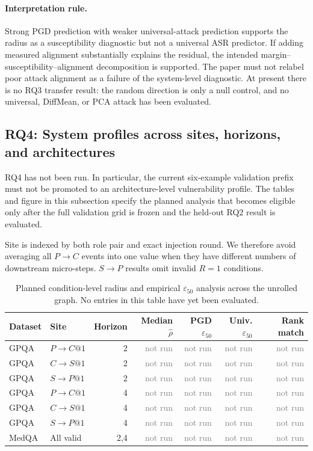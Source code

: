 \documentclass[11pt]{article}
\newcommand{\eps}{\varepsilon}
\newcommand{\NotRun}{\textcolor{gray}{not run}}
\begin{document}
\paragraph{Interpretation rule.}
Strong PGD prediction with weaker universal-attack prediction supports the
radius as a susceptibility diagnostic but not a universal ASR predictor. If
adding measured alignment substantially explains the residual, the intended
margin--susceptibility--alignment decomposition is supported. The paper must
not relabel poor attack alignment as a failure of the system-level diagnostic.
At present there is no RQ3 transfer result: the random direction is only a null
control, and no universal, DiffMean, or PCA attack has been evaluated.

\subsection{RQ4: System profiles across sites, horizons, and architectures}

RQ4 has not been run. In particular, the current six-example validation prefix
must not be promoted to an architecture-level vulnerability profile. The
tables and figure in this subsection specify the planned analysis that becomes
eligible only after the full validation grid is frozen and the held-out RQ2
result is evaluated.

Site is indexed by both role pair and exact injection round. We therefore avoid
averaging all $P{\to}C$ events into one value when they have different numbers
of downstream micro-steps. $S{\to}P$ results omit invalid $R=1$ conditions.

\begin{table}[t]
\centering
\small
\setlength{\tabcolsep}{3.5pt}
\caption{Planned condition-level radius and empirical $\eps_{50}$ analysis
across the unrolled graph. No entries in this table have yet been evaluated.}
\label{tab:site-horizon}
\begin{tabular}{llrrrrr}
\toprule
Dataset & Site & Horizon & Median $\widehat\rho$ & PGD $\eps_{50}$ & Univ. $\eps_{50}$ & Rank match \\
\midrule
GPQA & $P{\to}C@1$ & 2 & \NotRun & \NotRun & \NotRun & \NotRun \\
GPQA & $C{\to}S@1$ & 2 & \NotRun & \NotRun & \NotRun & \NotRun \\
GPQA & $S{\to}P@1$ & 2 & \NotRun & \NotRun & \NotRun & \NotRun \\
GPQA & $P{\to}C@1$ & 4 & \NotRun & \NotRun & \NotRun & \NotRun \\
GPQA & $C{\to}S@1$ & 4 & \NotRun & \NotRun & \NotRun & \NotRun \\
GPQA & $S{\to}P@1$ & 4 & \NotRun & \NotRun & \NotRun & \NotRun \\
MedQA & All valid & 2,4 & \NotRun & \NotRun & \NotRun & \NotRun \\
\bottomrule
\end{tabular}
\end{table}
\end{document}
